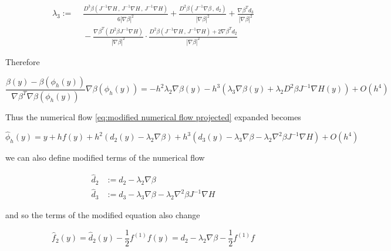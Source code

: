 \documentclass[12pt]{article}
\begin{document}
\begin{equation}\label{eq:lambda 3}
\begin{split}
    \lambda_3 := &\,\, \frac{D^3\beta \left( J^{-1} \nabla H\, ,\, J^{-1} \nabla H \, , \, J^{-1}\nabla H \right)}{6 |\nabla\beta|^2} + \frac{D^2\beta\left( J^{-1}\nabla\beta\, , \, d_2 \right)}{|\nabla\beta|^2} + \frac{\nabla\beta^T d_3}{|\nabla\beta|^2} \\
    &\,\, - \frac{\nabla\beta^T \left( D^2\beta J^{-1} \nabla H \right)}{|\nabla\beta|^2} \cdot \frac{D^2\beta\left( J^{-1} \nabla H\, , \, J^{-1}\nabla H\right) + 2\nabla\beta^T d_2}{|\nabla\beta|^2}
\end{split}
\end{equation}

Therefore

\begin{equation}\label{eq:oh3 projective pertubation}
    \frac{\beta(y) - \beta(\phi_h(y))}{\nabla\beta^T\nabla\beta(\phi_h(y))}\nabla\beta(\phi_h(y)) = - h^2 \lambda_2 \nabla\beta(y) - h^3\left( \lambda_3\nabla\beta(y) + \lambda_2 D^2\beta J^{-1}\nabla H(y)  \right)  + O(h^4)
\end{equation}

Thus the numerical flow \eqref{eq:modified numerical flow projected} expanded becomes

\begin{equation}\label{eq:expanded projection modified equation flow}
    \hat \phi_h(y) = y + hf(y) + h^2\left( d_2(y) - \lambda_2\nabla\beta \right) + h^3\left( d_3(y) - \lambda_3\nabla\beta - \lambda_2\nabla^2\beta J^{-1}\nabla H \right) + O(h^4)
\end{equation}

we can also define modified terms of the numerical flow 

\begin{equation}\label{eq:modified numerical flow terms of the equation}
\begin{split}
    \hat d_2 &:= d_2 - \lambda_2\nabla\beta \\
    \hat d_3 &:= d_3 - \lambda_3\nabla\beta - \lambda_2\nabla^2\beta J^{-1}\nabla H
\end{split}
\end{equation}

and so the terms of the modified equation also change 

\begin{equation}\label{eq:modified equation for general projection method f2}
    \hat f_2(y) = \hat d_2(y) - \frac{1}{2} f^{(1)}f(y) = d_2 - \lambda_2\nabla\beta - \frac{1}{2}f^{(1)}f
\end{equation}
\end{document}
